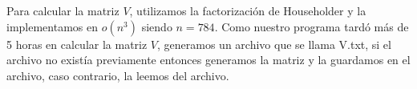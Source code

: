 Para calcular la matriz $V$, utilizamos la factorizaci\'on de Householder y la implementamos en $o(n^3)$ siendo $n = 784$. Como nuestro programa tard\'o m\'as de 5 horas en calcular la matriz $V$, generamos un archivo que se llama V.txt, si el archivo no exist\'ia previamente entonces generamos la matriz y la guardamos en el archivo, caso contrario, la leemos del archivo.